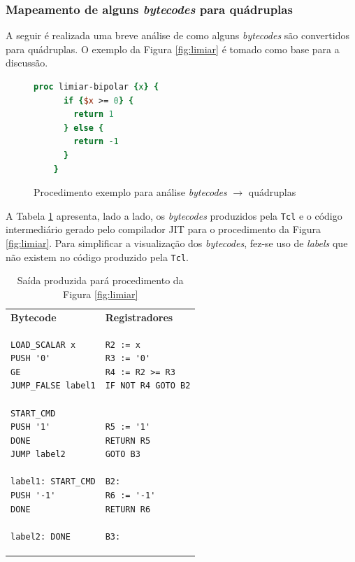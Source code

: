 \subsubsection{Mapeamento de alguns \textit{bytecodes} para quádruplas}

A seguir é realizada uma breve análise de como alguns
\textit{bytecodes} são convertidos para quádruplas. O exemplo da
Figura \ref{fig:limiar} é tomado como base para a discussão.


\begin{figure}[h]
  \centering
  \begin{lstlisting}[language=Tcl]
    proc limiar-bipolar {x} {
      if {$x >= 0} {
        return 1
      } else {
        return -1
      }
    }
  \end{lstlisting}
  \caption{Procedimento exemplo para análise \textit{bytecodes}
    $\rightarrow$ quádruplas\label{fig:limiar}}
\label{xx$xx}
\end{figure}

A Tabela \ref{tabela1} apresenta, lado a lado, os \textit{bytecodes}
produzidos pela \texttt{Tcl} e o código intermediário gerado pelo
compilador JIT para o procedimento
da Figura \ref{fig:limiar}. Para simplificar a visualização dos
\textit{bytecodes}, fez-se uso de \textit{labels} que não existem no
código produzido pela \texttt{Tcl}.

\begin{table}[h]
  \centering
  \caption{Saída produzida pará procedimento da Figura \ref{fig:limiar} \label{tabela1}}
  \begin{tabular}{| p{4cm} | p{4cm} |}
    \hline
    \bf{Bytecode} & \bf{Registradores} \\
\begin{verbatim}
LOAD_SCALAR x
PUSH '0'
GE
JUMP_FALSE label1

START_CMD
PUSH '1'
DONE
JUMP label2

label1: START_CMD
PUSH '-1'
DONE

label2: DONE
\end{verbatim} &
\begin{verbatim}
R2 := x
R3 := '0'
R4 := R2 >= R3
IF NOT R4 GOTO B2


R5 := '1'
RETURN R5
GOTO B3

B2:
R6 := '-1'
RETURN R6

B3:
\end{verbatim} \\
    \hline
  \end{tabular}
\end{table}


